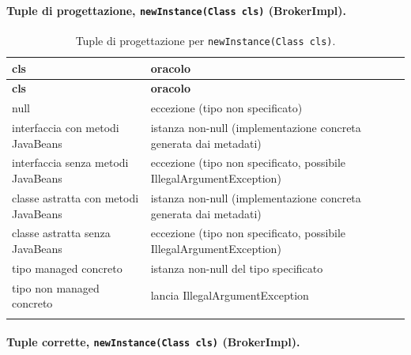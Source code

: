 \paragraph*{Tuple di progettazione, \texttt{newInstance(Class cls)} (BrokerImpl).}

{\footnotesize\setlength{\tabcolsep}{3pt}
\begin{longtable}{>{\raggedright\arraybackslash}p{}>{\raggedright\arraybackslash}p{}}
\toprule
\textbf{cls} & \textbf{oracolo} \\
\midrule
\endfirsthead
\toprule
\textbf{cls} & \textbf{oracolo} \\
\midrule
\endhead
\bottomrule
\endfoot
null & eccezione (tipo non specificato) \\
interfaccia con metodi JavaBeans & istanza non-null (implementazione concreta generata dai metadati) \\
interfaccia senza metodi JavaBeans & eccezione (tipo non specificato, possibile IllegalArgumentException) \\
classe astratta con metodi JavaBeans & istanza non-null (implementazione concreta generata dai metadati) \\
classe astratta senza JavaBeans & eccezione (tipo non specificato, possibile IllegalArgumentException) \\
tipo managed concreto & istanza non-null del tipo specificato \\
tipo non managed concreto & lancia IllegalArgumentException \\
\bottomrule
\caption{Tuple di progettazione per \texttt{newInstance(Class cls)}.}
\label{tab:newinstance-tuple}
\end{longtable}
}



\paragraph*{Tuple corrette, \texttt{newInstance(Class cls)} (BrokerImpl).}


